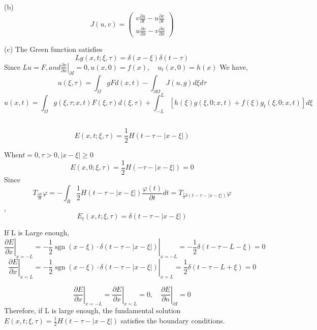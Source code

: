 \documentclass{article}
\begin{document}
(b)
$$
J ( u , v ) =  \left( \begin{array} { l } { v \frac { \partial u } { \partial t } - u \frac { \partial v } {\partial t } }\\{ u \frac { \partial v } { \partial x } - v \frac { \partial u } { \partial x } }  \end{array} \right)
$$

(c)
The Green function satisfies
$$
L g  ( x , t ; \xi , \tau ) = \delta ( x - \xi )\delta ( t - \tau )
$$
Since $ Lu=F, and \left. \frac { \partial v } { \partial n } \right| _ { \partial I } = 0, u ( x , 0 ) = f ( x ) , \quad u _ { t } ( x , 0 ) = h ( x )$
We have,
$$
u ( \xi , \tau ) = \int _ { \Omega } g F d ( x , t )-\int _ { \partial \Omega } J \left( u , g \right) d \xi d\tau
$$
$$
u ( x , t ) = \int _ { \Omega } g(\xi,\tau;x,t) F(\xi, \tau) d ( \xi , \tau ) + \int _ { - L } ^ { L } \left[  h ( \xi ) g (\xi, 0; x,t ) + f ( \xi ) g _ { t } (\xi, 0; x,t ) \right] d \xi
$$

\subsection{}
$$ E ( x , t ; \xi , \tau ) = \frac { 1 } { 2 } H ( t - \tau - | x - \xi | )
$$

When\quad $ t=0, \tau > 0 , | x - \xi | \geq 0$ 
$$
E ( x , 0 ; \xi , \tau ) = \frac { 1 } { 2 } H ( - \tau - | x - \xi | )=0
$$
Since $$
T _ { \frac { \partial E } { \partial t } } \varphi = - \int _ { R } \frac { 1 } { 2 } H ( t - \tau - | x - \xi | ) \frac { \varphi ( t ) } { \partial t } d t= T _ { \frac { 1 } { 2 } \delta ( t - \tau - | x - \xi | ) } \varphi
$$,
$$E _ { t } ( x , t ; \xi , \tau ) = \delta ( t - \tau - | x - \xi | )$$

If L is Large enough,$$
 \left. \frac { \partial E } { \partial x } \right| _ { x = - L } =  \left. - \frac { 1 } { 2 } \operatorname { sgn } ( x - \xi ) \cdot \delta ( t - \tau - | x - \xi | ) \right| _ { x = -L } = -\frac { 1 } { 2 } \delta \left( t - \tau - L -\xi \right) = 0
$$
$$
\left. \frac { \partial E } { \partial x } \right| _ { x = L } =  \left. - \frac { 1 } { 2 } \operatorname { sgn } ( x - \xi ) \cdot \delta ( t - \tau - | x - \xi | ) \right| _ { x = L } = \frac { 1 } { 2 }  \delta \left( t - \tau - L +\xi \right) = 0
$$

$$
\left. \frac { \partial E } { \partial x } \right| _ { x = -L } = \left. \frac { \partial E } { \partial x } \right| _ { x = L } = 0, \quad \left. \frac { \partial E } { \partial n } \right| _ { \partial I } = 0$$
Therefore, if L is large enough, the fundamental solution$ E ( x , t ; \xi , \tau ) = \frac { 1 } { 2 } H ( t - \tau - | x - \xi | )$ satisfies the boundary conditions.
\end{document}
